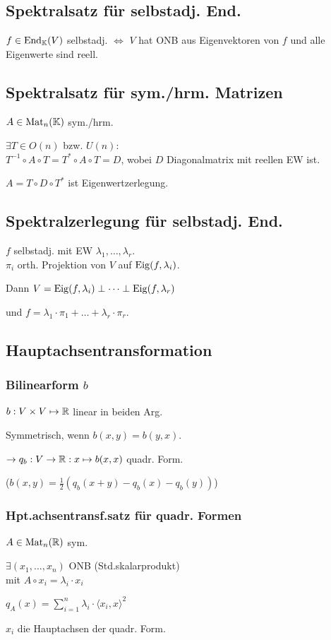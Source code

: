 \subsection*{Spektralsatz für selbstadj. End.}
$f\in\operatorname{End}_{\mathbb{K}}(V)$ selbstadj. $\iff$ $V$ hat ONB aus Eigenvektoren von $f$
und alle Eigenwerte sind reell.

\subsection*{Spektralsatz für sym./hrm. Matrizen}
$A\in\operatorname{Mat}_n(\mathbb{K})$ sym./hrm.

$\exists T\in O(n)$ bzw. $U(n):$ \\
$T^{-1}\circ A \circ T=T^*\circ A \circ T=D$,
wobei $D$ Diagonalmatrix mit reellen EW ist.

$A=T\circ D \circ T^*$ ist Eigenwertzerlegung.

\subsection*{Spektralzerlegung für selbstadj. End.}
$f$ selbstadj. mit EW $\lambda_1,\dots,\lambda_r$. \\
$\pi_i$ orth. Projektion von $V$ auf $\operatorname{Eig}(f,\lambda_i)$.

Dann $V=\operatorname{Eig}(f,\lambda_i)\perp\dots\perp \operatorname{Eig}(f,\lambda_r)$

und $f = \lambda_1\cdot\pi_1 + \dots + \lambda_r\cdot\pi_r$.

\subsection*{Hauptachsentransformation}

\subsubsection*{Bilinearform $b$}
$b:V\times V \mapsto \mathbb{R}$ linear in beiden Arg.

Symmetrisch, wenn $b(x,y)=b(y,x)$.

$\rightarrow q_b: V\to\mathbb{R}:x\mapsto b(x,x)$ quadr. Form.

($b(x,y)=\frac{1}{2}(q_b(x+y)-q_b(x)-q_b(y))$)

\subsubsection*{Hpt.achsentransf.satz für quadr. Formen}
$A\in\operatorname{Mat}_n(\mathbb{R})$ sym.

$\exists (x_1,\dots,x_n)$ ONB (Std.skalarprodukt) \\
mit $A\circ x_i = \lambda_i \cdot x_i$

$\displaystyle q_A(x)=\sum_{i=1}^n\lambda_i\cdot\langle x_i,x\rangle^2$

$x_i$ die Hauptachsen der quadr. Form.
